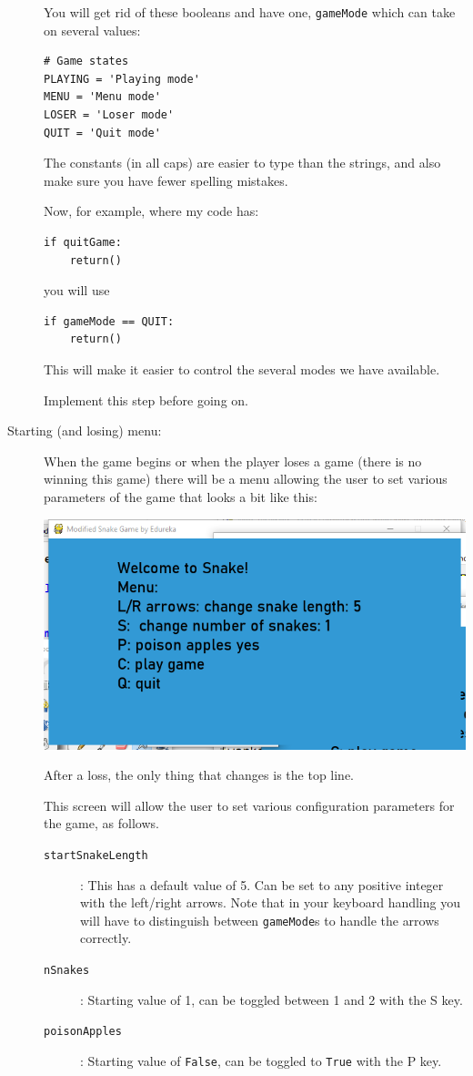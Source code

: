 \documentclass[12pt]{article}
\begin{document}
\begin{description}
You will get rid of these booleans and have one, \lstinline{gameMode}
which can take on several values:
\begin{lstlisting}
# Game states
PLAYING = 'Playing mode'
MENU = 'Menu mode'
LOSER = 'Loser mode'
QUIT = 'Quit mode'
\end{lstlisting}
The constants (in all caps) are easier to type than the strings,
and also make sure you have fewer spelling mistakes.

Now, for example, where my code has:
\begin{lstlisting}
if quitGame:
    return()
\end{lstlisting}
you will use
\begin{lstlisting}
if gameMode == QUIT:
    return()
\end{lstlisting}
This will make it easier to control the several modes we have 
available.

Implement this step before going on.

\item[Starting (and losing) menu:]
When the game begins or when the player loses a game
(there is no winning this game) there will be a menu
allowing the user to set various parameters of the game
that looks a bit like this:

\centerline{\includegraphics[scale=0.25]{menu}}

After a loss, the only thing that changes is the top line.

This screen will allow the user to set various configuration
parameters for the game, as follows.

\begin{description}
\item[\tt startSnakeLength]:
This has a default value of 5.  Can be set to any positive
integer with the left/right arrows.  Note that in your
keyboard handling you will have to distinguish between
\lstinline{gameMode}s to handle the arrows correctly.
\item[\tt nSnakes]:  Starting value of 1,  can be
toggled between 1 and 2 with the S key.
\item[\tt poisonApples]: Starting value of \lstinline{False},
can be toggled to \lstinline{True} with the P key.
\end{description}


\end{description}
\end{document}
